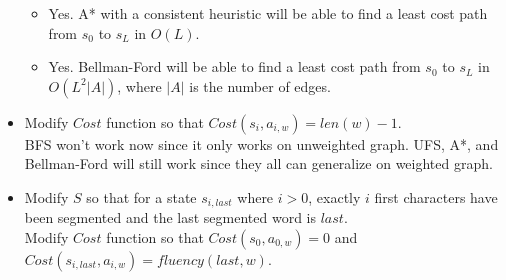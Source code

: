 \documentclass[11pt]{article}
\begin{document}
\begin{onehalfspace}
\begin{itemize}
\begin{itemize}
            \item
            Yes. A* with a consistent heuristic will be able to find a least cost path from $s_0$ to $s_L$ in $O(L)$.
            \item
            Yes. Bellman-Ford will be able to find a least cost path from $s_0$ to $s_L$ in $O(L^2|A|)$, where $|A|$ is the number of edges.
        \end{itemize}
        \item
            Modify $Cost$ function so that $Cost(s_i, a_{i,w}) = len(w) - 1$. \\
            BFS won't work now since it only works on unweighted graph. UFS, A*, and Bellman-Ford will still work since they all can generalize on weighted graph.
        \item
            Modify $S$ so that for a state $s_{i,last}$ where $i > 0$, exactly $i$ first characters have been segmented and the last segmented word is $last$. \\
            Modify $Cost$ function so that $Cost(s_0, a_{0,w}) = 0$ and $Cost(s_{i,last}, a_{i,w}) = fluency(last, w)$.
    \end{itemize}
    \newpage{}

\end{onehalfspace}
\end{document}
